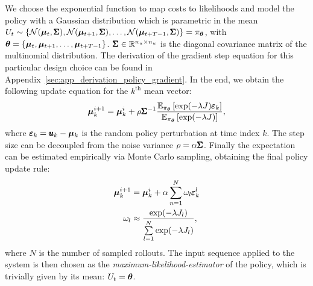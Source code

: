 We choose the exponential function to map costs to likelihoods and model the policy with a Gaussian distribution which is parametric in the mean $U_t \sim \{\mathcal{N}(\boldsymbol{\mu}_t, \pmb{\Sigma}), \mathcal{N}(\boldsymbol{\mu}_{t+1}, \pmb{\Sigma}), \dots, \mathcal{N}(\boldsymbol{\mu}_{t+T-1}, \pmb{\Sigma})\} = \pi_{\boldsymbol{\theta}}$, with $\boldsymbol{\theta} =  \{\boldsymbol{\mu}_t, \boldsymbol{\mu}_{t+1}, \dots, \boldsymbol{\mu}_{t+T-1}\}$. $\pmb{\Sigma} \in \mathbb{R}^{n_u \times n_u}$ is the diagonal covariance matrix of the multinomial distribution. The derivation of the gradient step equation for this particular design choice can be found in Appendix~\ref{sec:app_derivation_policy_gradient}. In the end, we obtain the following update equation for the $k^{\text{th}}$ mean vector:
\begin{equation}
    \boldsymbol{\mu}^{i+1}_{k} = \boldsymbol{\mu}^{i}_{k} +  \rho \pmb{\Sigma}^{-1} \frac{\mathbb{E}_{\pi_{\boldsymbol{\theta}}} \left [\exp( -\lambda J) \pmb{\varepsilon}_k \right]}{\mathbb{E}_{\pi_{\boldsymbol{\theta}}} \left [\exp( -\lambda J)\right]}  \label{eq:alpha_assumption},
\end{equation}
where $\pmb{\varepsilon}_k = \pmb{u}_k - \boldsymbol{\mu}_k$ is the random policy perturbation at time index $k$.
The step size can be decoupled from the noise variance $\rho = \alpha \pmb{\Sigma} $. Finally the expectation can be estimated empirically via Monte Carlo sampling, obtaining the final policy update rule:
\begin{align} \label{eq:update_rule}
  \boldsymbol{\mu}^{i+1}_{k} &= \boldsymbol{\mu}^{i}_{k} + \alpha  \sum \limits_{n=1}^{N}  \omega_l \pmb{\varepsilon}_{k}^{l} \\
  \omega_l  &\approx \frac{\exp ( -\lambda J_l )}{\sum \limits_{l=1}^{N} \exp ( -\lambda J_l)}, \label{eq:weighting}
\end{align}
where $N$ is the number of sampled rollouts. 
The input sequence applied to the system is then chosen as the \emph{maximum-likelihood-estimator} of the policy, which is trivially given by its mean: $U_t = \boldsymbol{\theta}$.

